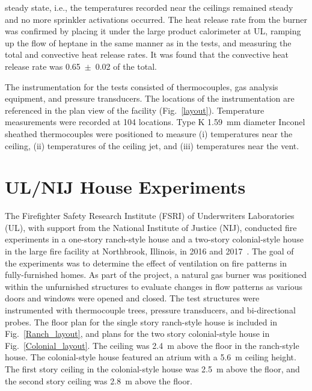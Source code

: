 \begin{description}
steady state, i.e., the temperatures recorded near the ceilings remained steady and no more sprinkler activations occurred.
The heat release rate from the burner was confirmed by placing it under the large product calorimeter at UL, ramping up the flow of heptane in the
same manner as in the tests, and measuring the total and convective heat release rates. It was found that the convective heat release rate was
0.65~$\pm$~0.02 of the total.
\item[Instrumentation:] The instrumentation for the tests consisted of thermocouples, gas analysis equipment, and pressure transducers. The locations of the instrumentation are referenced in the plan view of the facility (Fig.~\ref{layout}). Temperature measurements were recorded at 104 locations. Type K 1.59~mm diameter Inconel sheathed thermocouples were positioned to measure (i) temperatures near the ceiling, (ii) temperatures of the ceiling jet, and (iii) temperatures near the vent.
\end{description}

\FloatBarrier

\section{UL/NIJ House Experiments}
\label{UL_NIJ_Description}

The Firefighter Safety Research Institute (FSRI) of Underwriters Laboratories (UL), with support from the National Institute of Justice (NIJ), conducted fire experiments in a one-story ranch-style house and a two-story colonial-style house in the large fire facility at Northbrook, Illinois, in 2016 and 2017~\cite{Madrzykowski:2019}. The goal of the experiments was to determine the effect of ventilation on fire patterns in fully-furnished homes. As part of the project, a natural gas burner was positioned within the unfurnished structures to evaluate changes in flow patterns as various doors and windows were opened and closed. The test structures were instrumented with thermocouple trees, pressure transducers, and bi-directional probes. The floor plan for the single story ranch-style house is included in Fig.~\ref{Ranch_layout}, and plans for the two story colonial-style house in Fig.~\ref{Colonial_layout}. The ceiling was 2.4~m above the floor in the ranch-style house. The colonial-style house featured an atrium with a 5.6~m ceiling height. The first story ceiling in the colonial-style house was 2.5~m above the floor, and the second story ceiling was 2.8~m above the floor.

